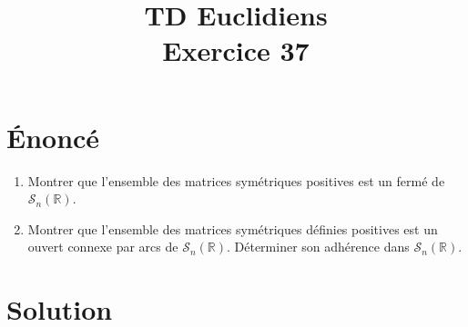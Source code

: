 \documentclass[french]{article}
\title{TD Euclidiens\\ Exercice 37}
\date{}
\newcommand{\R}{\mathbb{R}}
\begin{document}
\maketitle

\section{Énoncé}
\begin{enumerate}
	\item Montrer que l'ensemble des matrices symétriques positives est un fermé de $\mathcal{S}_n(\R)$.
	\item Montrer que l'ensemble des matrices symétriques définies positives est un ouvert connexe par arcs de $\mathcal{S}_n(\R)$. Déterminer son adhérence dans $\mathcal{S}_n(\R)$.
\end{enumerate}
\section{Solution}
\end{document}
